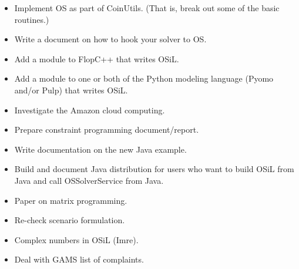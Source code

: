 \begin{itemize}

\item Implement OS as part of CoinUtils. (That is, break out some of the basic routines.)

\item Write a document on how to hook your solver to OS.

\item Add a module to FlopC++ that writes OSiL.

\item Add a module to one or both of the Python modeling language (Pyomo and/or Pulp) that writes OSiL.

\item Investigate the Amazon cloud computing.




\item Prepare constraint programming document/report.


\item Write documentation on the new Java example.

\item Build and document Java distribution for users who want to build OSiL from Java and 
call OSSolverService from Java. 

\item Paper on matrix programming.

\item Re-check scenario formulation.


\item Complex numbers in OSiL (Imre).


\item Deal with GAMS list of complaints.


\end{itemize}
